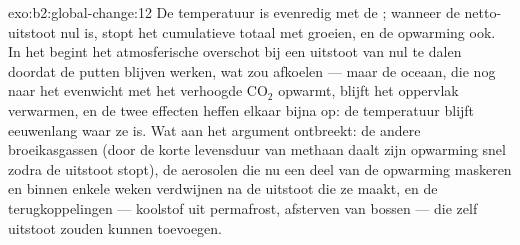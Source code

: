 \begin{solution}{exo:b2:global-change:12}
De temperatuur is evenredig met de ; wanneer de
netto-uitstoot nul is, stopt het cumulatieve totaal met groeien, en de
opwarming ook. In het  begint het atmosferische overschot bij een
uitstoot van nul te dalen doordat de putten blijven werken, wat zou
afkoelen --- maar de oceaan, die nog naar het evenwicht met het verhoogde
\ensuremath{\mathrm{CO_2}} opwarmt, blijft het oppervlak verwarmen, en de twee
effecten heffen elkaar bijna op: de temperatuur blijft eeuwenlang
waar ze is. Wat aan het argument ontbreekt: de andere broeikasgassen
(door de korte levensduur van methaan daalt zijn opwarming snel zodra de
uitstoot stopt), de aerosolen die nu een deel van de opwarming maskeren en
binnen enkele weken verdwijnen na de uitstoot die ze maakt, en de
terugkoppelingen --- koolstof uit permafrost, afsterven van bossen --- die zelf
uitstoot zouden kunnen toevoegen.
\end{solution}

